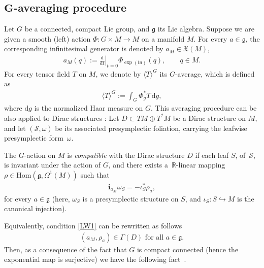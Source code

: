 \documentclass[pdftex]{sigma}
\numberwithin{equation}{section}
\begin{document}
\subsection[$G$-averaging procedure]{$\boldsymbol{G}$-averaging procedure}
Let $G$ be a connected, compact Lie group, and $\mathfrak{g}$ its Lie algebra. Suppose we are given a smooth (left) action $\Phi\colon G\times M\rightarrow M$ on a manifold $M$. For every $a\in\mathfrak{g}$, the corresponding inf\/initesimal generator is denoted by $a_{M}\in\mathfrak{X}(M)$,
\begin{gather*}
a_{M}(q):=\left.\frac{\mathrm{d}}{\mathrm{d}t}\right|_{t=0}\Phi_{\exp(ta)}(q),\qquad q\in M.
\end{gather*}
For every tensor f\/ield $T$ on $M$, we denote by $ \langle T \rangle^{G}$ its $G$-average, which is def\/ined as
\begin{gather*}
 \langle T \rangle^{G}:=\int_G \Phi^{\ast}_{g}T\,\mathrm{d}g,
\end{gather*}
where $\mathrm{d}g$ is the normalized Haar measure on $G$. This averaging procedure can be also applied to Dirac structures \cite{JVYV-14}: Let $D\subset TM\oplus T^{\ast}M$ be a Dirac structure on $M$, and let $(\mathcal{S},\omega)$ be its associated presymplectic foliation, carrying the leafwise presymplectic form~$\omega$.

\begin{Definition}\label{def2.1}
The $G$-action on $M$ is \emph{compatible} with the Dirac structure $D$ if each leaf $S$, of~$\mathcal{S}$, is invariant under the action of $G$, and there exists a~$\mathbb{R}$-linear mapping $\rho\in\mathrm{Hom}(\mathfrak{g},\Omega^{1}(M))$ such that
\begin{gather}
\mathbf{i}_{a_{M}}\omega_S=-\iota^\ast_S\rho_{a}, \label{LW1}
\end{gather}
for every $a\in\mathfrak{g}$ (here, $\omega_S$ is a presymplectic structure on $S$, and $\iota_S\colon S\hookrightarrow M$ is the canonical injection).
\end{Definition}

Equivalently, condition \eqref{LW1} can be rewritten as follows
\begin{gather*}
(a_{M},\rho_{a})\in\Gamma(D)\mbox{ for all }a\in\mathfrak{g}. %
\end{gather*}
Then, as a consequence of the fact that $G$ is compact connected (hence the exponential map is surjective) we have the following fact~\cite{JVYV-14}.
\end{document}
